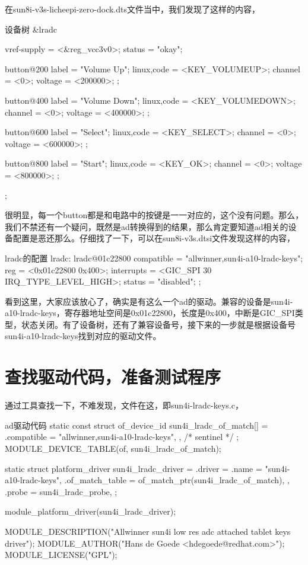 \documentclass[lang=cn,newtx,10pt,scheme=chinese]{elegantbook}
\begin{document}
在sun8i-v3s-licheepi-zero-dock.dts文件当中，我们发现了这样的内容，

\begin{mycode}{设备树}
&lradc {
	vref-supply = <&reg_vcc3v0>;
	status = "okay";
 
	button@200 {
		label = "Volume Up";
		linux,code = <KEY_VOLUMEUP>;
		channel = <0>;
		voltage = <200000>;
	};
 
	button@400 {
		label = "Volume Down";
		linux,code = <KEY_VOLUMEDOWN>;
		channel = <0>;
		voltage = <400000>;
	};
 
	button@600 {
		label = "Select";
		linux,code = <KEY_SELECT>;
		channel = <0>;
		voltage = <600000>;
	};
 
	button@800 {
		label = "Start";
		linux,code = <KEY_OK>;
		channel = <0>;
		voltage = <800000>;
	};
};
\end{mycode}

很明显，每一个button都是和电路中的按键是一一对应的，这个没有问题。那么，我们不禁还有一个疑问，既然是ad转换得到的结果，那么肯定要知道ad相关的设备配置是恶还那么。仔细找了一下，可以在sun8i-v3s.dtsi文件发现这样的内容，

\begin{mycode}{lradc的配置}
lradc: lradc@01c22800 {
    compatible = "allwinner,sun4i-a10-lradc-keys";
    reg = <0x01c22800 0x400>;
    interrupts = <GIC_SPI 30 IRQ_TYPE_LEVEL_HIGH>;
    status = "disabled";
};
\end{mycode}

看到这里，大家应该放心了，确实是有这么一个ad的驱动。兼容的设备是sun4i-a10-lradc-keys，寄存器地址空间是0x01c22800，长度是0x400，中断是GIC\_SPI类型，状态关闭。有了设备树，还有了兼容设备号，接下来的一步就是根据设备号sun4i-a10-lradc-keys找到对应的驱动文件。

\section{查找驱动代码，准备测试程序}

通过工具查找一下，不难发现，文件在这，即sun4i-lradc-keys.c，

\begin{mycode}{ad驱动代码}
static const struct of_device_id sun4i_lradc_of_match[] = {
    { .compatible = "allwinner,sun4i-a10-lradc-keys", },
    { /* sentinel */ }
};
MODULE_DEVICE_TABLE(of, sun4i_lradc_of_match);

static struct platform_driver sun4i_lradc_driver = {
    .driver = {
        .name	= "sun4i-a10-lradc-keys",
        .of_match_table = of_match_ptr(sun4i_lradc_of_match),
    },
    .probe	= sun4i_lradc_probe,
};

module_platform_driver(sun4i_lradc_driver);

MODULE_DESCRIPTION("Allwinner sun4i low res adc attached tablet keys driver");
MODULE_AUTHOR("Hans de Goede <hdegoede@redhat.com>");
MODULE_LICENSE("GPL");    
\end{mycode}
\end{document}
